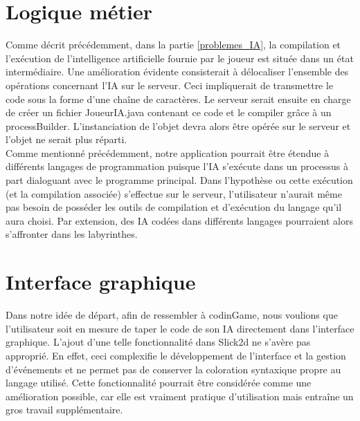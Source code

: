 \section{Logique métier}
	
	Comme décrit précédemment, dans la partie \ref{problemes_IA}, la compilation et l'exécution de l'intelligence artificielle fournie par le joueur est située dans un état intermédiaire. Une amélioration évidente consisterait à délocaliser l'ensemble des opérations concernant l'IA sur le serveur. Ceci impliquerait de transmettre le code sous la forme d'une chaîne de caractères. Le serveur serait ensuite en charge de créer un fichier JoueurIA.java contenant ce code et le compiler grâce à un processBuilder. L'instanciation de l'objet devra alors être opérée sur le serveur et l'objet ne serait plus réparti. \\
	
	Comme mentionné précédemment, notre application pourrait être étendue à différents langages de programmation puisque l'IA s'exécute dans un processus à part dialoguant avec le programme principal. Dans l'hypothèse ou cette exécution (et la compilation associée) s'effectue sur le serveur, l'utilisateur n'aurait même pas besoin de posséder les outils de compilation et d'exécution du langage qu'il aura choisi. Par extension, des IA codées dans différents langages pourraient alors s'affronter dans les labyrinthes.

\section{Interface graphique}

Dans notre idée de départ, afin de ressembler à codinGame, nous voulions que l'utilisateur soit en mesure de taper le code de son IA directement dans l'interface graphique. L'ajout d'une telle fonctionnalité dans Slick2d ne s'avère pas approprié. En effet, ceci complexifie le développement de l'interface et la gestion d'événements et ne permet pas de conserver la coloration syntaxique propre au langage utilisé. Cette fonctionnalité pourrait être considérée comme une amélioration possible, car elle est vraiment pratique d'utilisation mais entraîne un gros travail supplémentaire.